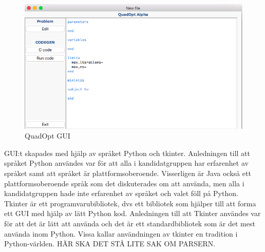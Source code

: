 \begin{figure}[h]
\centerline{\includegraphics[scale=0.58]{grafik/QuadOptGUI}}
\caption{QuadOpt GUI}
\label{fig:quadoptgui}
\end{figure}

GUI:t skapades med hjälp av språket Python och tkinter. Anledningen till att språket Python användes var för att alla i kandidatgruppen har erfarenhet av språket samt att språket är plattformsoberoende. Visserligen är Java också ett plattformsoberoende språk som det diskuterades om att använda, men alla i kandidatgruppen hade inte erfarenhet av språket och valet föll på Python.
\newline
\newline
Tkinter är ett programvarubibliotek, dvs ett bibliotek som hjälper till att forma ett GUI med hjälp av lätt Python kod. Anledningen till att Tkinter användes var för att det är lätt att använda och det är ett standardbibliotek som är det mest använda inom Python. Vissa kallar användningen av tkinter en tradition i Python-världen.
\newline
\newline
HÄR SKA DET STÅ LITE SAK OM PARSERN. 